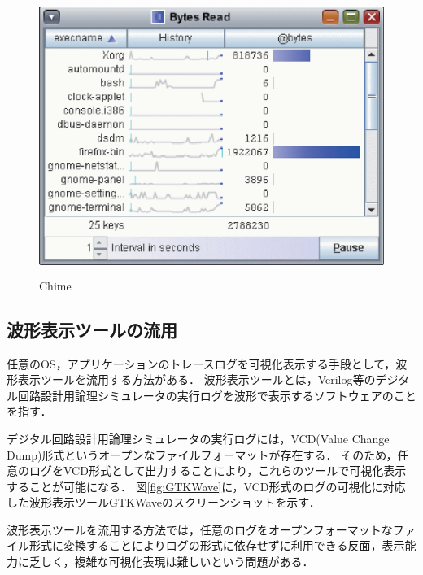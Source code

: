 \begin{figure}[p]
\begin{center}
\includegraphics[height=9cm]{img/Chime.eps}
\caption{Chime}
\label{fig:Chime}
\end{center}
\end{figure}

\subsection{波形表示ツールの流用}

任意のOS，アプリケーションのトレースログを可視化表示する手段として，波形表示ツールを流用する方法がある．
波形表示ツールとは，Verilog等のデジタル回路設計用論理シミュレータの実行ログを波形で表示するソフトウェアのことを指す．

デジタル回路設計用論理シミュレータの実行ログには，VCD(Value Change Dump)形式というオープンなファイルフォーマットが存在する．
そのため，任意のログをVCD形式として出力することにより，これらのツールで可視化表示することが可能になる．
図\ref{fig:GTKWave}に，VCD形式のログの可視化に対応した波形表示ツールGTKWaveのスクリーンショットを示す．

波形表示ツールを流用する方法では，任意のログをオープンフォーマットなファイル形式に変換することによりログの形式に依存せずに利用できる反面，表示能力に乏しく，複雑な可視化表現は難しいという問題がある．

